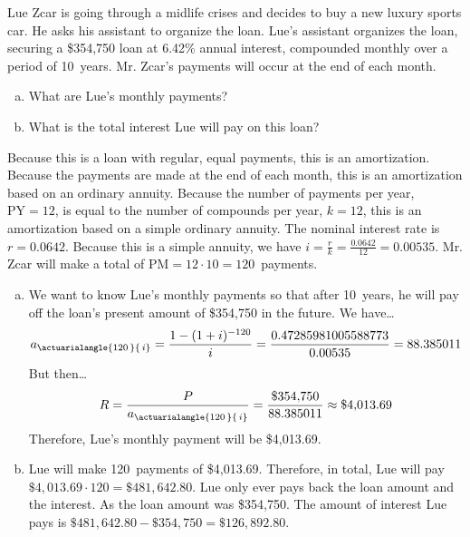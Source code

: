 \documentclass[11pt,letterpaper]{article}
\newcommand{\actA}[2]{a_{\actuarialangle{#1\,}{\,#2}}} %
\begin{document}

 Lue Zcar is going through a midlife crises and decides to buy a new luxury sports car. He asks his assistant to organize the loan. Lue's assistant organizes the loan, securing a \$354,750 loan at 6.42\% annual interest, compounded monthly over a period of 10~years. Mr. Zcar's payments will occur at the end of each month. 
	\begin{enumerate}[(a)]
	\item What are Lue's monthly payments?
	\item What is the total interest Lue will pay on this loan?
	\end{enumerate} \pspace

\sol Because this is a loan with regular, equal payments, this is an amortization. Because the payments are made at the end of each month, this is an amortization based on an ordinary annuity. Because the number of payments per year, $\text{PY}= 12$, is equal to the number of compounds per year, $k= 12$, this is an amortization based on a simple ordinary annuity. The nominal interest rate is $r= 0.0642$. Because this is a simple annuity, we have $i= \frac{r}{k}= \frac{0.0642}{12}= 0.00535$. Mr. Zcar will make a total of $\text{PM}= 12 \cdot 10= 120$~payments. 

\begin{enumerate}[(a)]
\item We want to know Lue's monthly payments so that after 10~years, he will pay off the loan's present amount of \$354,750 in the future. We have\dots
	\[
	\actA{120}{i}= \dfrac{1 - (1 + i)^{-120}}{i}= \dfrac{0.47285981005588773}{0.00535}= 88.385011
	\] 
But then\dots
	\[
	R= \dfrac{P}{\actA{120}{i}}= \dfrac{\$354,\!750}{88.385011} \approx \$4,\!013.69 
	\]
Therefore, Lue's monthly payment will be \$4,013.69. \pspace

\item Lue will make 120~payments of \$4,013.69. Therefore, in total, Lue will pay $\$4,\!013.69 \cdot 120= \$481,\!642.80$. Lue only ever pays back the loan amount and the interest. As the loan amount was \$354,750. The amount of interest Lue pays is $\$481,\!642.80 - \$354,\!750= \$126,\!892.80$. 
\end{enumerate}
\end{document}
